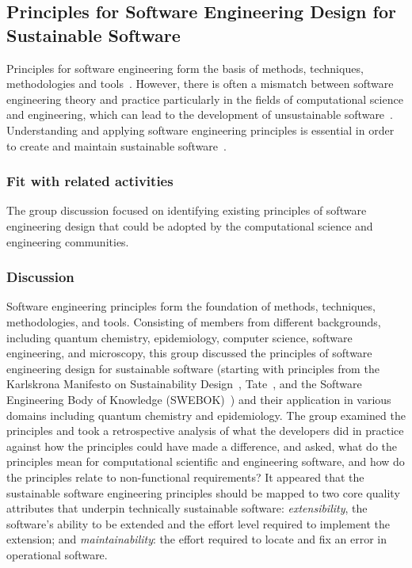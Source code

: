 \subsection{Principles for Software Engineering Design for Sustainable Software} 


Principles for software engineering form the basis of methods, techniques,
methodologies and tools~\cite{Vliet:2008}. However, there is often a mismatch
between software engineering theory and practice particularly in the fields of
computational science and engineering, which can lead to the development of
unsustainable software~\cite{Merali:2010,hettrick:2014}. Understanding and
applying software engineering principles is essential in order to create and
maintain sustainable software~\cite{Becker:2016}.

\subsubsection{Fit with related activities}

The group discussion focused on identifying existing principles of software
engineering design that could be adopted by the computational science and
engineering communities.

\subsubsection{Discussion}

Software engineering principles form the foundation of methods, techniques,
methodologies, and tools.  Consisting of members from different
backgrounds, including quantum chemistry, epidemiology, computer science,
software engineering, and microscopy, this group discussed the principles of software
engineering design for sustainable software (starting with principles from the
Karlskrona Manifesto on Sustainability Design~\cite{Becker:2015},
Tate~\cite{tate:2005}, and the Software Engineering Body of Knowledge
(SWEBOK)~\cite{swebokv3}) and their application in various domains including
quantum chemistry and epidemiology. The group examined the principles and took a
retrospective analysis of what the developers did in practice against how the
principles could have made a difference, and asked, what do the principles mean
for computational scientific and engineering software, and how do the principles
relate to non-functional requirements? It appeared that the sustainable software
engineering principles should be mapped to two core quality attributes that
underpin technically sustainable software: \emph{extensibility}, the software's ability
to be extended and the effort level required to implement the extension; and
\emph{maintainability}: the effort required to locate and fix an error in operational
software.

